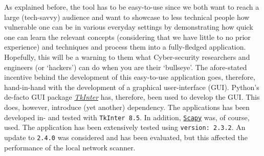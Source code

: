 As explained before, the tool has to be easy-to-use since we both want to reach a large (tech-savvy) audience and want to showcase to less technical people how vulnerable one can be in various everyday settings by demonstrating how quick one can learn the relevant concepts (considering that we have little to no prior experience) and techniques and process them into a fully-fledged application. Hopefully, this will be a warning to them what Cyber-security researchers and engineers (or `hackers') can do when you are their `bullseye'. The afore-stated incentive behind the development of this easy-to-use application goes, therefore, hand-in-hand with the development of a graphical user-interface (GUI). Python's de-facto GUI package \href{https://wiki.python.org/moin/TkInter}{\textit{TkInter}} has, therefore, been used to develop the GUI. This does, however, introduce (yet another) dependency. The applications has been developed in- and tested with \texttt{TkInter 8.5}. In addition, \href{https://github.com/secdev/scapy}{\texttt{Scapy}} was, of course, used. The application has been extensively tested using \texttt{version: 2.3.2}. An update to \texttt{2.4.0} was considered and has been evaluated, but this affected the performance of the local network scanner. 


